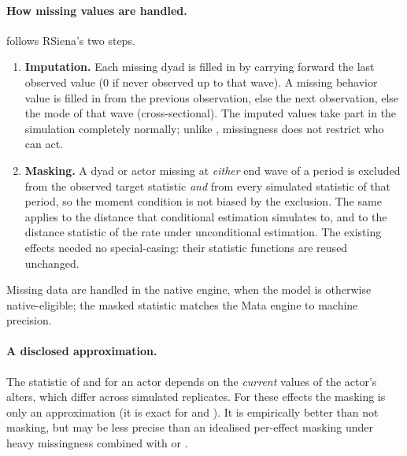 \paragraph{How missing values are handled.} \nwsaom{} follows RSiena's two steps.
\begin{enumerate}
\item \textbf{Imputation.} Each missing dyad is filled in by carrying forward the last observed value (0 if never observed up to that wave). A missing behavior value is filled in from the previous observation, else the next observation, else the mode of that wave (cross-sectional). The imputed values take part in the simulation completely normally; unlike , missingness does not restrict who can act.
\item \textbf{Masking.} A dyad or actor missing at \emph{either} end wave of a period is excluded from the observed target statistic \emph{and} from every simulated statistic of that period, so the moment condition is not biased by the exclusion. The same applies to the distance that conditional estimation simulates to, and to the distance statistic of the rate under unconditional estimation. The existing effects needed no special-casing: their statistic functions are reused unchanged.
\end{enumerate}
Missing data are handled in the native engine, when the model is otherwise native-eligible; the masked statistic matches the Mata engine to machine precision.

\paragraph{A disclosed approximation.} The statistic of  and  for an actor depends on the \emph{current} values of the actor's alters, which differ across simulated replicates. For these effects the masking is only an approximation (it is exact for  and ). It is empirically better than not masking, but may be less precise than an idealised per-effect masking under heavy missingness combined with  or .

